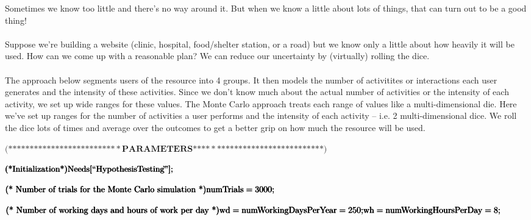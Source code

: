 \documentclass{article}
\begin{document}
Sometimes we know too little and there{'}s no way around it. But when we know a little about lots of things, that can turn out to be a good thing!
\\
\\
Suppose we{'}re building a website (clinic, hospital, food/shelter station, or a road) but we know only a little about how heavily it will be used.
How can we come up with a reasonable plan? We can reduce our uncertainty by (virtually) rolling the dice.\\
\\
The approach below segments users of the resource into 4 groups. It then models the number of activitites or interactions each user generates and
the intensity of these activities. Since we don{'}t know much about the actual number of activities or the intensity of each activity, we set up
wide ranges for these values. The Monte Carlo approach treats each range of values like a multi-dimensional die. Here we{'}ve set up ranges for the
number of activities a user performs and the intensity of each activity -- i.e. 2 multi-dimensional dice. We roll the dice lots of times and average
over the outcomes to get a better grip on how much the resource will be used.

\begin{doublespace}
\noindent\(\pmb{\text{(*} \text{**}\text{**}\text{**}\text{**}\text{**}\text{**}\text{**}\text{**}\text{**}\text{**}\text{**}\text{**}*\text{PARAMETERS}\text{**}\text{**}*\text{**}\text{**}\text{**}\text{**}\text{**}\text{**}\text{**}\text{**}\text{**}\text{**}\text{**}\text{**}
\text{*)}}\)
\end{doublespace}

\begin{doublespace}
\noindent\(\pmb{\text{(*} \text{Initialization} \text{*)}}\\
\pmb{\text{Needs}[\text{{``}HypothesisTesting$\grave{ }${''}}];}\)
\end{doublespace}

\begin{doublespace}
\noindent\(\pmb{\text{(* Number of trials for the Monte Carlo simulation *)}}\\
\pmb{\text{numTrials} = 3000;}\)
\end{doublespace}

\begin{doublespace}
\noindent\(\pmb{\text{(* Number of working days and hours of work per day *)}}\\
\pmb{\text{wd} = \text{numWorkingDaysPerYear} = 250;}\\
\pmb{\text{wh} = \text{numWorkingHoursPerDay} = 8;}\)
\end{doublespace}
\end{document}

